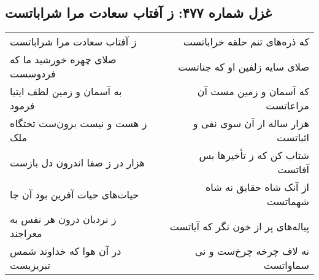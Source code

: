 \begin{center}
\section*{غزل شماره ۴۷۷: ز آفتاب سعادت مرا شراباتست}
\label{sec:0477}
\begin{longtable}{l p{0.5cm} r}
ز آفتاب سعادت مرا شراباتست
&&
که ذره‌های تنم حلقه خراباتست
\\
صلای چهره خورشید ما که فردوسست
&&
صلای سایه زلفین او که جناتست
\\
به آسمان و زمین لطف ایتیا فرمود
&&
که آسمان و زمین مست آن مراعاتست
\\
ز هست و نیست برون‌ست تختگاه ملک
&&
هزار ساله از آن سوی نفی و اثباتست
\\
هزار در ز صفا اندرون دل بازست
&&
شتاب کن که ز تأخیرها بس آفاتست
\\
حیات‌های حیات آفرین بود آن جا
&&
از آنک شاه حقایق نه شاه شهماتست
\\
ز نردبان درون هر نفس به معراجند
&&
پیاله‌های پر از خون نگر که آیاتست
\\
در آن هوا که خداوند شمس تبریزیست
&&
نه لاف چرخه چرخ‌ست و نی سماواتست
\\
\end{longtable}
\end{center}
